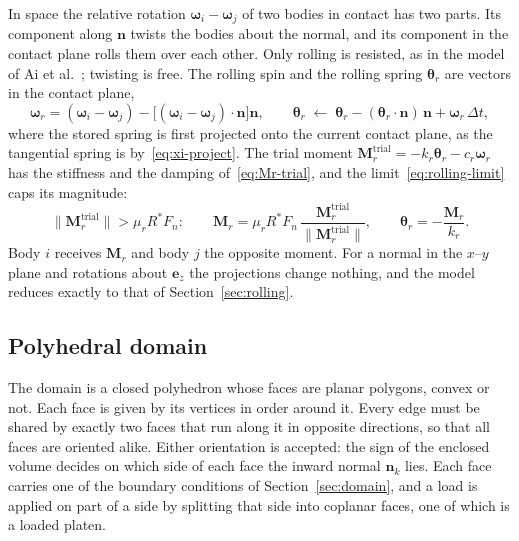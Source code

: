 In space the relative rotation $\boldsymbol{\omega}_{i}-\boldsymbol{\omega}_{j}$ of two bodies in contact has two parts.
Its component along $\mathbf{n}$ twists the bodies about the normal, and its component in the contact plane rolls them over each other.
Only rolling is resisted, as in the model of Ai et al.~\cite{ai2011}; twisting is free.
The rolling spin and the rolling spring $\boldsymbol{\theta}_{r}$ are vectors in the contact plane,
\begin{equation}
  \boldsymbol{\omega}_{r}
  = (\boldsymbol{\omega}_{i}-\boldsymbol{\omega}_{j})
    - \bigl[(\boldsymbol{\omega}_{i}-\boldsymbol{\omega}_{j})\cdot\mathbf{n}\bigr]\mathbf{n},
  \qquad
  \boldsymbol{\theta}_{r} \;\leftarrow\;
  \boldsymbol{\theta}_{r} - (\boldsymbol{\theta}_{r}\cdot\mathbf{n})\,\mathbf{n}
  + \boldsymbol{\omega}_{r}\,\Delta t ,
  \label{eq:theta-r-3d}
\end{equation}
where the stored spring is first projected onto the current contact plane, as the tangential spring is by~\eqref{eq:xi-project}.
The trial moment $\mathbf{M}_{r}^{\mathrm{trial}}=-k_{r}\boldsymbol{\theta}_{r}-c_{r}\boldsymbol{\omega}_{r}$ has the stiffness and the damping of~\eqref{eq:Mr-trial}, and the limit~\eqref{eq:rolling-limit} caps its magnitude:
\begin{equation}
  \lVert\mathbf{M}_{r}^{\mathrm{trial}}\rVert > \mu_{r}R^{*}F_{n}:
  \qquad
  \mathbf{M}_{r} = \mu_{r}R^{*}F_{n}\,
    \frac{\mathbf{M}_{r}^{\mathrm{trial}}}{\lVert\mathbf{M}_{r}^{\mathrm{trial}}\rVert},
  \qquad
  \boldsymbol{\theta}_{r} = -\frac{\mathbf{M}_{r}}{k_{r}} .
  \label{eq:rolling-limit-3d}
\end{equation}
Body $i$ receives $\mathbf{M}_{r}$ and body $j$ the opposite moment.
For a normal in the $x$--$y$ plane and rotations about $\mathbf{e}_{z}$ the projections change nothing, and the model reduces exactly to that of Section~\ref{sec:rolling}.

\subsection{Polyhedral domain}

The domain is a closed polyhedron whose faces are planar polygons, convex or not.
Each face is given by its vertices in order around it.
Every edge must be shared by exactly two faces that run along it in opposite directions, so that all faces are oriented alike.
Either orientation is accepted: the sign of the enclosed volume decides on which side of each face the inward normal $\mathbf{n}_{k}$ lies.
Each face carries one of the boundary conditions of Section~\ref{sec:domain}, and a load is applied on part of a side by splitting that side into coplanar faces, one of which is a loaded platen.

